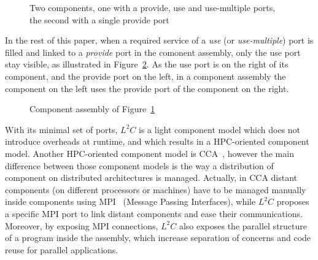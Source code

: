 \begin{figure}[h!]
\begin{center}
\caption{Two components, one with a provide, use and use-multiple ports, the second with a single provide port}
\label{fig:ports}
\end{center}
\end{figure}

In the rest of this paper, when a required service of a \emph{use} (or \emph{use-multiple}) port is filled and linked to a \emph{provide} port in the comonent assembly, only the use port stay visible, as illustrated in Figure~\ref{fig:assembly}. As the use port is on the right of its component, and the provide port on the left, in a component assembly the component on the left uses the provide port of the component on the right.

\begin{figure}[h!]
\begin{center}
\caption{Component assembly of Figure~\ref{fig:ports}}
\label{fig:assembly}
\end{center}
\end{figure}

With its minimal set of ports, $L^2C$ is a light component model which does not introduce overheads at runtime, and which results in a HPC-oriented component model. Another HPC-oriented component model is CCA~\cite{Armstrong:1999:TCC:822084.823232}, however the main difference between those component models is the way a distribution of component on distributed architectures is managed. Actually, in CCA distant components (on different processors or machines) have to be managed manually inside components using MPI~\cite{Graham2009MSE} (Message Passing Interfaces), while $L^2C$ proposes a specific MPI port to link distant components and ease their communications. Moreover, by exposing MPI connections, $L^2C$ also exposes the parallel structure of a program inside the assembly, which increase separation of concerns and code reuse for parallel applications.

